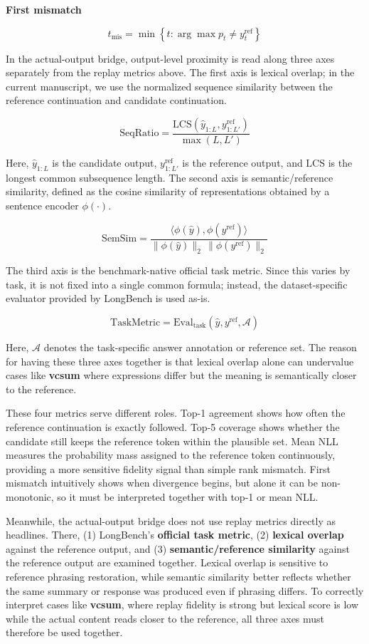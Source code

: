 \textbf{First mismatch}


$$
t_{\mathrm{mis}}
=
\min \left\{ t : \arg\max p_t \neq y_t^{\mathrm{ref}} \right\}
$$


In the actual-output bridge, output-level proximity is read along three axes separately from the replay metrics above. The first axis is lexical overlap; in the current manuscript, we use the normalized sequence similarity between the reference continuation and candidate continuation.


$$
\mathrm{SeqRatio}
=
\frac{\mathrm{LCS}(\hat{y}_{1:L}, y^{\mathrm{ref}}_{1:L'})}{\max(L,L')}
$$


Here, $\hat{y}_{1:L}$ is the candidate output, $y^{\mathrm{ref}}_{1:L'}$ is the reference output, and $\mathrm{LCS}$ is the longest common subsequence length. The second axis is semantic/reference similarity, defined as the cosine similarity of representations obtained by a sentence encoder $\phi(\cdot)$.


$$
\mathrm{SemSim}
=
\frac{\langle \phi(\hat{y}), \phi(y^{\mathrm{ref}}) \rangle}{\|\phi(\hat{y})\|_2\,\|\phi(y^{\mathrm{ref}})\|_2}
$$


The third axis is the benchmark-native official task metric. Since this varies by task, it is not fixed into a single common formula; instead, the dataset-specific evaluator provided by LongBench is used as-is.


$$
\mathrm{TaskMetric}
=
\mathrm{Eval}_{\mathrm{task}}(\hat{y}, y^{\mathrm{ref}}, \mathcal{A})
$$


Here, $\mathcal{A}$ denotes the task-specific answer annotation or reference set. The reason for having these three axes together is that lexical overlap alone can undervalue cases like \textbf{vcsum} where expressions differ but the meaning is semantically closer to the reference.


These four metrics serve different roles. Top-1 agreement shows how often the reference continuation is exactly followed. Top-5 coverage shows whether the candidate still keeps the reference token within the plausible set. Mean NLL measures the probability mass assigned to the reference token continuously, providing a more sensitive fidelity signal than simple rank mismatch. First mismatch intuitively shows when divergence begins, but alone it can be non-monotonic, so it must be interpreted together with top-1 or mean NLL.


Meanwhile, the actual-output bridge does not use replay metrics directly as headlines. There, (1) LongBench's \textbf{official task metric}, (2) \textbf{lexical overlap} against the reference output, and (3) \textbf{semantic/reference similarity} against the reference output are examined together. Lexical overlap is sensitive to reference phrasing restoration, while semantic similarity better reflects whether the same summary or response was produced even if phrasing differs. To correctly interpret cases like \textbf{vcsum}, where replay fidelity is strong but lexical score is low while the actual content reads closer to the reference, all three axes must therefore be used together.


